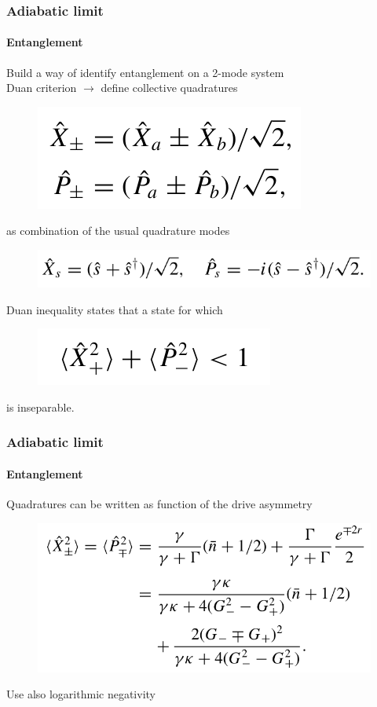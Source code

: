 \documentclass[aspectratio=43]{beamer}
\begin{document}
\begin{frame}
	
	\frametitle{Adiabatic limit}
	\framesubtitle{Entanglement}
	
	Build a way of identify entanglement on a 2-mode system\\
	Duan criterion $\longrightarrow$ define collective quadratures
	\begin{figure}
		\includegraphics[width = 4 cm]{plots/entanglement_quad.png}
	\end{figure}	
	
	as combination of the usual quadrature modes
	\begin{figure}
		\includegraphics[width = 6.5 cm]{plots/entanglement_quad_2.png}
	\end{figure}

	Duan inequality states that a state for which
	\begin{figure}
		\includegraphics[width = 4 cm]{plots/entanglement_duan_criterion.png}
	\end{figure}

	is inseparable.

\end{frame}

\begin{frame}

	\frametitle{Adiabatic limit}
	\framesubtitle{Entanglement}
		
	Quadratures can be written as function of the drive asymmetry 
	\begin{figure}
		\includegraphics[width = 6.5 cm]{plots/entanglement_quadratures.png}
	\end{figure}

	Use also logarithmic negativity 

\end{frame}
\end{document}
